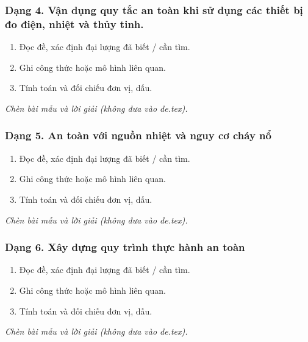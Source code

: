 \subsubsection{Dạng 4. Vận dụng quy tắc an toàn khi sử dụng các thiết bị đo điện, nhiệt và thủy tinh.}
\begin{phuongphap}
\begin{enumerate}
\item Đọc đề, xác định đại lượng đã biết / cần tìm.
\item Ghi công thức hoặc mô hình liên quan.
\item Tính toán và đối chiếu đơn vị, dấu.
\end{enumerate}
\end{phuongphap}
\begin{vidumau}
\textit{Chèn bài mẫu và lời giải (không đưa vào de.tex).}
\end{vidumau}

\subsubsection{Dạng 5. An toàn với nguồn nhiệt và nguy cơ cháy nổ}
\begin{phuongphap}
\begin{enumerate}
\item Đọc đề, xác định đại lượng đã biết / cần tìm.
\item Ghi công thức hoặc mô hình liên quan.
\item Tính toán và đối chiếu đơn vị, dấu.
\end{enumerate}
\end{phuongphap}
\begin{vidumau}
\textit{Chèn bài mẫu và lời giải (không đưa vào de.tex).}
\end{vidumau}

\subsubsection{Dạng 6. Xây dựng quy trình thực hành an toàn}
\begin{phuongphap}
\begin{enumerate}
\item Đọc đề, xác định đại lượng đã biết / cần tìm.
\item Ghi công thức hoặc mô hình liên quan.
\item Tính toán và đối chiếu đơn vị, dấu.
\end{enumerate}
\end{phuongphap}
\begin{vidumau}
\textit{Chèn bài mẫu và lời giải (không đưa vào de.tex).}
\end{vidumau}

